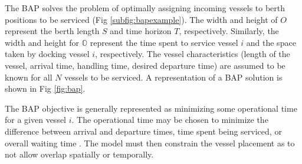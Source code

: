 \documentclass[letterpaper, 10pt, conference]{IEEEtran}
\begin{document}
The BAP solves the problem of optimally assigning incoming vessels to berth positions to be serviced (Fig
\ref{subfig:bapexample}). The width and height of $O$ represent the berth length $S$ and time horizon $T$, respectively.
Similarly, the width and height for $\mathbb{O}$ represent the time spent to service vessel $i$ and the space taken by
docking vessel $i$, respectively. The vessel characteristics (length of the vessel, arrival time, handling time, desired
departure time) are assumed to be known for all $N$ vessels to be serviced. A representation of a BAP solution is shown
in Fig \ref{fig:bap}.

The BAP objective is generally represented as minimizing some operational time for a given vessel $i$. The operational
time may be chosen to minimize the difference between arrival and departure times, time spent being serviced, or overall
waiting time \cite{Voss2007, Buhrkal2010,Frojan2015}. The model must then constrain the vessel placement as to not allow
overlap spatially or temporally.
\end{document}
